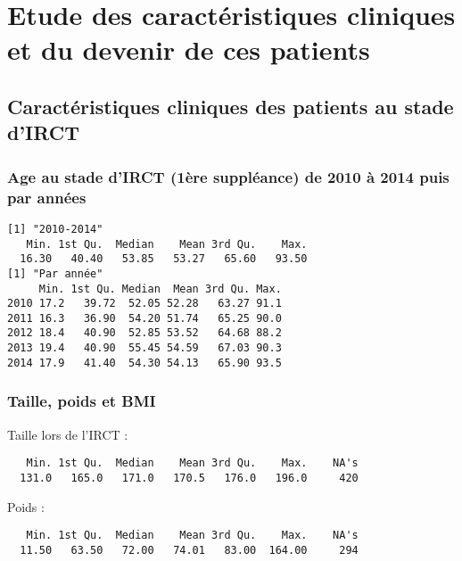 \documentclass[11pt,a4paper]{article}\usepackage[]{graphicx}\usepackage[]{color}
\makeatletter
\newenvironment{kframe}{%
 \def\at@end@of@kframe{}%
 \ifinner\ifhmode%
  \def\at@end@of@kframe{\end{minipage}}%
  \begin{minipage}{\columnwidth}%
 \fi\fi%
 \def\FrameCommand##1{\hskip\@totalleftmargin \hskip-\fboxsep
 \colorbox{shadecolor}{##1}\hskip-\fboxsep
     \hskip-\linewidth \hskip-\@totalleftmargin \hskip\columnwidth}%
 \MakeFramed {\advance\hsize-\width
   \@totalleftmargin\z@ \linewidth\hsize
   \@setminipage}}%
 {\par\unskip\endMakeFramed%
 \at@end@of@kframe}
\newenvironment{knitrout}{}{} %
\makeatother
\begin{document}
\section{Etude des caractéristiques cliniques et du devenir de ces patients}

  \subsection{Caractéristiques cliniques des patients au stade d’IRCT}
  
    \subsubsection{Age au stade d’IRCT (1ère suppléance) de 2010 à 2014 puis par années}

\begin{knitrout}
\color{fgcolor}\begin{kframe}
\begin{verbatim}
[1] "2010-2014"
   Min. 1st Qu.  Median    Mean 3rd Qu.    Max. 
  16.30   40.40   53.85   53.27   65.60   93.50 
[1] "Par année"
     Min. 1st Qu. Median  Mean 3rd Qu. Max.
2010 17.2   39.72  52.05 52.28   63.27 91.1
2011 16.3   36.90  54.20 51.74   65.25 90.0
2012 18.4   40.90  52.85 53.52   64.68 88.2
2013 19.4   40.90  55.45 54.59   67.03 90.3
2014 17.9   41.40  54.30 54.13   65.90 93.5
\end{verbatim}
\end{kframe}
\end{knitrout}

    \subsubsection{Taille, poids et BMI}
  
  Taille lors de l'IRCT :
  
\begin{knitrout}
\color{fgcolor}\begin{kframe}
\begin{verbatim}
   Min. 1st Qu.  Median    Mean 3rd Qu.    Max.    NA's 
  131.0   165.0   171.0   170.5   176.0   196.0     420 
\end{verbatim}
\end{kframe}
\end{knitrout}

Poids :

\begin{knitrout}
\color{fgcolor}\begin{kframe}
\begin{verbatim}
   Min. 1st Qu.  Median    Mean 3rd Qu.    Max.    NA's 
  11.50   63.50   72.00   74.01   83.00  164.00     294 
\end{verbatim}
\end{kframe}
\end{knitrout}
\end{document}

